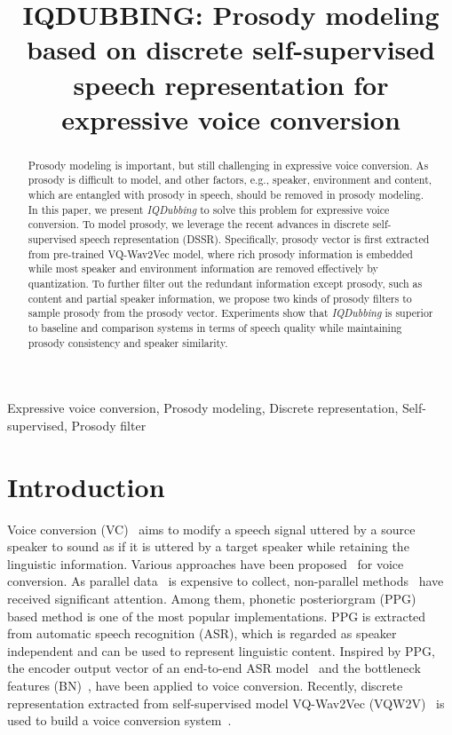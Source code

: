 \documentclass{article}
\title{IQDUBBING: Prosody modeling based on discrete self-supervised speech representation for expressive voice conversion}
\begin{document}
\ninept
%
\maketitle
%
\begin{abstract}
Prosody modeling is important, but still challenging in expressive voice conversion. As prosody is difficult to model, and other factors, e.g., speaker, environment and content, which are entangled with prosody in speech, should be removed in prosody modeling. In this paper, we present \textit{IQDubbing} to solve this problem for expressive voice conversion. To model prosody, we leverage the recent advances in discrete self-supervised speech representation (DSSR). Specifically, prosody vector is first extracted from pre-trained VQ-Wav2Vec model, where rich prosody information is embedded while most speaker and environment information are removed effectively by quantization. To further filter out the redundant information except prosody, such as content and partial speaker information, we propose two kinds of prosody filters to sample prosody from the prosody vector. Experiments show that \textit{IQDubbing} is superior to baseline and comparison systems in terms of speech quality while maintaining prosody consistency and speaker similarity.
\end{abstract}
%
\begin{keywords}
Expressive voice conversion, Prosody modeling, Discrete representation, Self-supervised, Prosody filter 
\end{keywords}
%
\section{Introduction}
\label{sec:intro}

Voice conversion (VC)~\cite{ezzine2017comparative} aims to modify a speech signal
uttered by a source speaker to sound as if it is uttered by a
target speaker while retaining the linguistic information. Various approaches have been proposed~\cite{sisman2020overview} for voice conversion. As parallel data~\cite{ezzine2017comparative} is expensive to collect, non-parallel methods~\cite{hsu2016voice,kaneko2018cyclegan,sun2016phonetic} have received significant attention. Among them, phonetic posteriorgram (PPG)~\cite{sun2016phonetic} based method is one of the most popular implementations. PPG is extracted from automatic speech recognition (ASR), which is regarded as speaker independent and can be used to represent linguistic content.  Inspired by PPG, the encoder output vector of an end-to-end ASR model~\cite{liu2021fastsvc} and the  bottleneck features (BN)~\cite{lian2021towards}, have been applied to voice conversion. Recently, discrete representation extracted from self-supervised model VQ-Wav2Vec (VQW2V)~\cite{baevski2019vq} is used to build a voice conversion system~\cite{huang2021any}.
\end{document}
